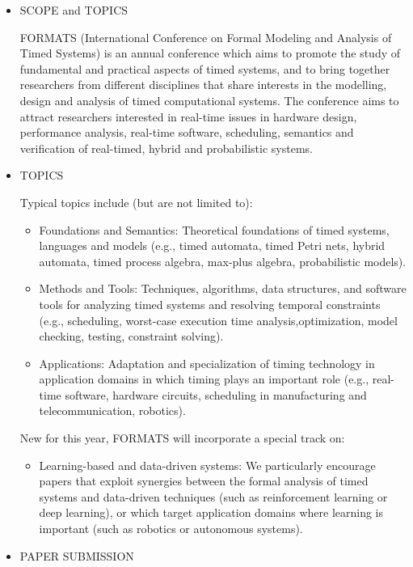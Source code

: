 \documentclass[prodmode,acmtecs]{acmsmall} %
\begin{document}
\begin{itemize}\item  SCOPE and TOPICS 
 
  FORMATS (International Conference on Formal Modeling and Analysis of Timed Systems) is an annual conference which aims to promote the study of fundamental and practical aspects of timed systems, and to bring together researchers from different disciplines that share interests in the modelling, design and analysis of timed computational systems. The conference aims to attract researchers interested in real-time issues in hardware design, performance analysis, real-time software, scheduling, semantics and verification of real-timed, hybrid and probabilistic systems. 
 
\item  TOPICS 
 
  Typical topics include (but are not limited to): 
 
\begin{itemize}\item  Foundations and Semantics: Theoretical foundations of timed systems, languages and models (e.g., timed automata, timed Petri nets, hybrid automata, timed process algebra, max-plus algebra, probabilistic models).
\item  Methods and Tools: Techniques, algorithms, data structures, and software tools for analyzing timed systems and resolving temporal constraints (e.g., scheduling, worst-case execution time analysis,optimization, model checking, testing, constraint solving).
\item  Applications: Adaptation and specialization of timing technology in application domains in which timing plays an important role (e.g., real-time software, hardware circuits, scheduling in manufacturing and telecommunication, robotics).
\end{itemize} 
  New for this year, FORMATS will incorporate a special track on: 
 
\begin{itemize}\item  Learning-based and data-driven systems: We particularly encourage papers that exploit synergies between the formal analysis of timed systems and data-driven techniques (such as reinforcement learning or deep learning), or which target application domains where learning is important (such as robotics or autonomous systems).
\end{itemize} 
\item  PAPER SUBMISSION 
 

\end{itemize}
\end{document}
